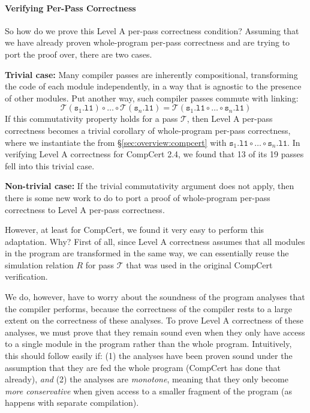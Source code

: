 \paragraph{Verifying Per-Pass Correctness}
So how do we prove this Level A per-pass correctness condition?
Assuming that we have already proven whole-program per-pass correctness
and are trying to port the proof over, there are two cases.

\textbf{Trivial case:} Many compiler passes are inherently
compositional, transforming the code of each module independently, \ie
in a way that is agnostic to the presence of other modules.  Put
another way, such compiler passes commute with linking:
\[
\mathcal{T}(\mathtt{s}_1\mathtt{.l1})\circ \ldots \circ \mathcal{T}(\mathtt{s}_n\mathtt{.l1}) = \mathcal{T}(\mathtt{s}_1\mathtt{.l1}\circ \ldots \circ \mathtt{s}_n\mathtt{.l1})
\]
If this commutativity property holds for a pass $\mathcal{T}$, then
Level A per-pass correctness becomes a trivial corollary of
whole-program per-pass correctness, where we instantiate the 
from \S\ref{sec:overview:compcert} with $\mathtt{s}_1\mathtt{.l1}\circ
\ldots \circ \mathtt{s}_n\mathtt{.l1}$.  In verifying Level A
correctness for CompCert 2.4, we found that 13 of its 19 passes fell
into this trivial case.

\textbf{Non-trivial case:} If the trivial commutativity argument does
not apply, then there is some new work to do to port a proof of
whole-program per-pass correctness to Level A per-pass correctness.

However, at least for CompCert, we found it very easy to perform this
adaptation.  Why?  First of all, since Level A correctness assumes
that all modules in the program are transformed in the same way, we
can essentially reuse the simulation relation $R$ for pass
$\mathcal{T}$ that was used in the original CompCert verification.

We do, however, have to worry about the soundness of the program
analyses that the compiler performs, because the correctness of the
compiler rests to a large extent on the correctness of these analyses.
To prove Level A correctness of these analyses, we must prove that
they remain sound even when they only have access to a single module
in the program rather than the whole program.  Intuitively, this
should follow easily if: (1) the analyses have been proven sound under
the assumption that they are fed the whole program (CompCert has done
that already), \emph{and} (2) the analyses are \emph{monotone},
meaning that they only become \emph{more conservative} when given
access to a smaller fragment of the program (as happens with separate
compilation).

